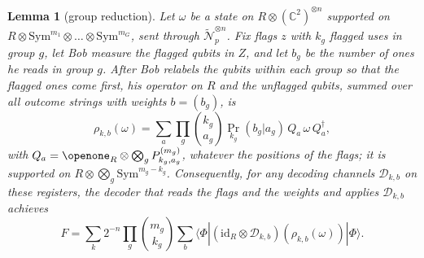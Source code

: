 \documentclass[aps,pra,twocolumn,superscriptaddress,nofootinbib,longbibliography,floatfix]{revtex4-2}
\newtheorem{lemma}[theorem]{Lemma}
\newcommand{\ket}[1]{|#1\rangle}
\newcommand{\bra}[1]{\langle #1|}
\newcommand{\nt}{\widetilde{\mathcal N}}
\newcommand{\mes}{\varPhi}
\newcommand{\sym}{\mathrm{Sym}}
\newcommand{\id}{\mathrm{id}}
\newcommand{\prk}{\operatorname{Pr}}
\begin{document}
\begin{lemma}[group reduction]
\label{lem:groups}
Let $\omega$ be a state on $R\otimes(\mathbb C^2)^{\otimes n}$ supported on $R\otimes\sym^{m_1}\otimes\dots\otimes\sym^{m_G}$, sent through $\nt_p^{\otimes n}$. Fix flags $z$ with $k_g$ flagged uses in group $g$, let Bob measure the flagged qubits in $Z$, and let $b_g$ be the number of ones he reads in group $g$. After Bob relabels the qubits within each group so that the flagged ones come first, his operator on $R$ and the unflagged qubits, summed over all outcome strings with weights $b=(b_g)$, is
\begin{equation}
\label{eq:groups}
\rho_{k,b}(\omega)=\sum_{a}\prod_{g}\binom{k_g}{a_g}\prk_{k_g}(b_g|a_g)\,Q_a\,\omega\,Q_a^\dagger,
\end{equation}
with $Q_a=\openone_R\otimes\bigotimes_gP^{(m_g)}_{k_g,a_g}$, whatever the positions of the flags; it is supported on $R\otimes\bigotimes_g\sym^{m_g-k_g}$. Consequently, for any decoding channels $\mathcal D_{k,b}$ on these registers, the decoder that reads the flags and the weights and applies $\mathcal D_{k,b}$ achieves
\begin{equation}
\label{eq:groupsF}
F=\sum_{k}2^{-n}\prod_g\binom{m_g}{k_g}\sum_{b}\bra{\mes}(\id_R\otimes\mathcal D_{k,b})(\rho_{k,b}(\omega))\ket{\mes}.
\end{equation}
\end{lemma}
\end{document}
